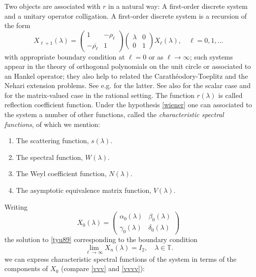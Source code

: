 \documentclass[12pt]{amsart}
\theoremstyle{definition}
\theoremstyle{remark}
\numberwithin{equation}{section}
\begin{document}
      Two objects are associated  with $r$ in a natural way: A first-order discrete system and a unitary operator colligation.  A first-order discrete system is a
      recursion of the form
      \begin{equation}
        \label{tyu89}
X_{\ell+1}({\lambda})=\begin{pmatrix}1&-\rho_\ell\\ -\overline{\rho_\ell}&1\end{pmatrix}\begin{pmatrix}{\lambda}&0\\0&1\end{pmatrix} X_\ell({\lambda}),\quad \ell=0,1,\ldots
\end{equation}
with appropriate boundary condition at $\ell=0$ or as $\ell\rightarrow\infty$; such systems appear in the theory of orthogonal polynomials on the unit circle or associated to an
Hankel operator; they also help to related the {C}arath\'eodory-{T}oeplitz and the {N}ehari extension problems.
See e.g. \cite{adamyan95,MR2000c:33001} for the latter.  See also \cite{MR2002d:47021,ag-def} for the scalar case and \cite{ag-def-vec, egl-95} for the matrix-valued case
in the rational setting.
The function $r({\lambda})$ is called reflection coefficient function. Under the hypothesis \eqref{wiener} one can associated to the system a number of other functions,
called the {\sl characteristic spectral functions}, of which we mention:
\begin{enumerate}

\item The scattering function, $s({\lambda})$.

\item The spectral function, $W({\lambda})$.

\item The Weyl coefficient function, $N({\lambda})$.

  \item The asymptotic equivalence matrix function, $V({\lambda})$.
  \end{enumerate}

      Writing
    \[
      X_0({\lambda})=\begin{pmatrix}\alpha_0({\lambda})&\beta_0({\lambda})\\
        \gamma_0({\lambda})&\delta_0({\lambda})\end{pmatrix}
    \]
    the solution to \eqref{tyu89} corresponding to the boundary condition
    \begin{equation}
      \label{cond-yui}
\lim_{\ell\rightarrow\infty}X_n({\lambda})=I_2,\quad {\lambda}\in\mathbb T.
      \end{equation}
    we can express characteristic spectral functions of the system in terms of the components of $X_0$ (compare \eqref{vvv} and \eqref{vvvv}):
\end{document}
